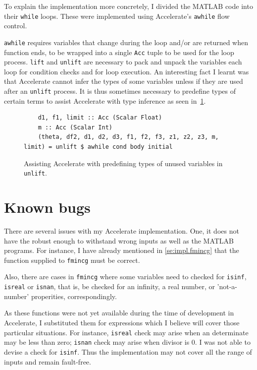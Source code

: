 To explain the implementation more concretely, I divided the MATLAB code into their \texttt{while} loops. These were implemented using Accelerate's \texttt{awhile} flow control. 

\texttt{awhile} requires variables that change during the loop and/or are returned when function ends, to be wrapped into a single \texttt{Acc} tuple to be used for the loop process. \texttt{lift} and \texttt{unlift} are necessary to pack and unpack the variables each loop for condition checks and for loop execution. An interesting fact I learnt was that Accelerate cannot infer the types of some variables unless if they are used after an \texttt{unlift} process. It is thus sometimes necessary to predefine types of certain terms to assist Accelerate with type inference as seen in~\ref{fig:unlift}.

\begin{figure}
	\begin{lstlisting}
    d1, f1, limit :: Acc (Scalar Float)
    m :: Acc (Scalar Int)
    (theta, df2, d1, d2, d3, f1, f2, f3, z1, z2, z3, m, limit) = unlift $ awhile cond body initial
	\end{lstlisting}
  	\caption{Assisting Accelerate with predefining types of unused variables in \texttt{unlift}.}
	\label{fig:unlift}
\end{figure}

\section{Known bugs} \label{se:impl.limits}

There are several issues with my Accelerate implementation. One, it does not have the robust enough to withstand wrong inputs as well as the MATLAB programs. For instance, I have already mentioned in \ref{se:impl.fmincg} that the function supplied to \texttt{fmincg} must be correct. 

Also, there are cases in \texttt{fmincg} where some variables need to checked for \texttt{isinf}, \texttt{isreal} or \texttt{isnan}, that is, be checked for an infinity, a real number, or 'not-a-number' properities, correspondingly. 

As these functions were not yet available during the time of development in Accelerate, I substituted them for expressions which I believe will cover those particular situations. For instance, \texttt{isreal} check may arise when an determinate may be less than zero; \texttt{isnan} check may arise when divisor is 0. I was not able to devise a check for \texttt{isinf}. Thus the implementation may not cover all the range of inputs and remain fault-free.

